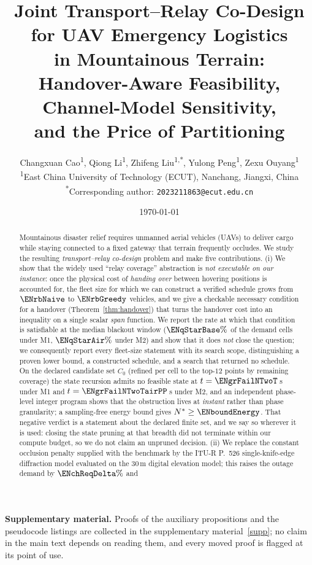 \documentclass[11pt]{article}
\title{\bfseries Joint Transport--Relay Co-Design for UAV Emergency Logistics\\
in Mountainous Terrain:\\ Handover-Aware Feasibility, Channel-Model Sensitivity,\\
and the Price of Partitioning}
\author{Changxuan Cao\textsuperscript{1}, Qiong Li\textsuperscript{1},
Zhifeng Liu\textsuperscript{1,*}, Yulong Peng\textsuperscript{1}, Zexu Ouyang\textsuperscript{1}\\
\small \textsuperscript{1}East China University of Technology (ECUT), Nanchang, Jiangxi, China\\
\small \textsuperscript{*}Corresponding author: \texttt{2023211863@ecut.edu.cn}}
\date{\today}
\theoremstyle{dshplain}
\theoremstyle{dshdefn}
\begin{document}
\maketitle

\noindent\textbf{Supplementary material.} Proofs of the auxiliary propositions and the pseudocode listings are collected in the supplementary material~\ref{supp}; no claim in the main text depends on reading them, and every moved proof is flagged at its point of use.

\begin{abstract}
\noindent
Mountainous disaster relief requires unmanned aerial vehicles (UAVs) to deliver
cargo while staying connected to a fixed gateway that terrain frequently
occludes. We study the resulting \emph{transport--relay co-design} problem and
make five contributions.
(i) We show that the widely used ``relay coverage'' abstraction is
\emph{not executable on our instance}: once the physical cost of \emph{handing
over} between hovering positions is accounted for, the fleet size for which we can
construct a verified schedule grows from $\ENrbNaive$ to $\ENrbGreedy$ vehicles,
and we give a checkable necessary condition for a handover
(Theorem~\ref{thm:handover}) that turns the handover cost into an inequality on a
single scalar \emph{span} function. We report the rate at which that condition is
satisfiable at the median blackout window ($\ENqStarBase\%$ of the demand cells
under M1, $\ENqStarAir\%$ under M2) and show that it does
\emph{not} close the question; we consequently report every fleet-size statement
with its search scope, distinguishing a proven lower bound, a constructed
schedule, and a search that returned no schedule. On the declared candidate set
$C_0$ (refined per cell to the top-$12$ points by remaining coverage) the state
recursion admits no feasible state at $t=\ENgrFailNTwoT$\,s under M1 and
$t=\ENgrFailNTwoTairPP$\,s under M2, and an independent phase-level integer
program shows that the obstruction lives at \emph{instant} rather than phase
granularity; a sampling-free energy bound gives $N^{*}\ge\ENboundEnergy$. That
negative verdict is a statement about the declared finite set, and we say so
wherever it is used: closing the state pruning at that breadth did not terminate
within our compute budget, so we do not claim an unpruned decision.
(ii) We replace the constant occlusion penalty supplied with the benchmark by
the ITU-R P.~526 single-knife-edge diffraction model evaluated on the 30\,m
digital elevation model; this raises the outage demand by $\ENchReqDelta\%$ and

\end{abstract}
\end{document}
